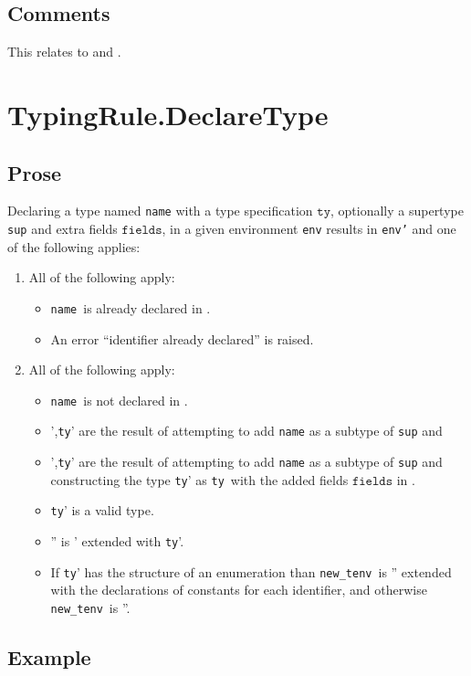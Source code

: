 \documentclass{book}
\newcommand\name[0]{\texttt{name}}
\newcommand\newtenv[0]{\texttt{new\_tenv}}
\newcommand\tty[0]{\texttt{ty}}
\newcommand\fields[0]{\texttt{fields}}
\begin{document}
\subsection{Comments}
This relates to  and .

\section{TypingRule.DeclareType \label{sec:TypingRule.DeclareType}}
\subsection{Prose}
Declaring a type named \texttt{name} with a type specification $\tty$,
optionally a supertype \texttt{sup} and extra fields $\fields$, in a given environment \texttt{env} results
in \texttt{env'} and one of the following applies:
\begin{enumerate}
  \item All of the following apply:
  \begin{itemize}
    \item \name\ is already declared in \tenv.
    \item An error ``identifier already declared'' is raised.
  \end{itemize}
  \item All of the following apply:
  \begin{itemize}
    \item \name\ is not declared in \tenv.
    \item  \tenv',\tty' are the result of attempting to add \texttt{name} as a subtype of \texttt{sup} and
    \item  \tenv',\tty' are the result of attempting to add \texttt{name} as a subtype of \texttt{sup} and
    constructing the type \tty' as \tty\ with the added fields $\fields$ in \tenv.
    \item \tty' is a valid type.
    \item \tenv'' is \tenv' extended with \tty'.
    \item If \tty' has the structure of an enumeration than \newtenv\ is \tenv'' extended with the declarations of constants for each identifier,
    and otherwise \newtenv\ is \tenv''.
  \end{itemize}
\end{enumerate}

\subsection{Example}
\end{document}
